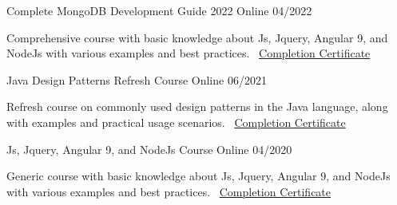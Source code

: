 \documentclass[]{awesome-cv}
\begin{document}
\begin{cventries}
	\cventry
	{}
	{Complete MongoDB Development Guide 2022 \vspace{-4mm}}
	{Online \vspace{-5mm}}
	{04/2022 \vspace{-5mm}}
	{\begin{cvsectionnormaltext} 
		\item{Comprehensive course with basic knowledge about Js, Jquery, Angular 9, and NodeJs with various examples and best practices.
		\newline \vspace{2mm} \faLink\ \href{https://www.udemy.com/certificate/UC-b990e98a-9b76-44b1-8e3e-43b68213725c/}{Completion Certificate}}
	\end{cvsectionnormaltext}}
    {}
    
	\cventry
	{}
	{Java Design Patterns Refresh Course \vspace{-4mm}}
	{Online \vspace{-5mm}}
	{06/2021 \vspace{-5mm}}
	{\begin{cvsectionnormaltext} 
		\item{Refresh course on commonly used design patterns in the Java language, along with examples and practical usage scenarios.
		\newline \vspace{2mm} \faLink\ \href{https://www.udemy.com/certificate/UC-982e3338-ea7d-4434-bf27-af8e38b77bd5/}{Completion Certificate}}
	\end{cvsectionnormaltext}}
    {}

    
	\cventry
	{}
	{Js, Jquery, Angular 9, and NodeJs Course \vspace{-4mm}}
	{Online \vspace{-5mm}}
	{04/2020 \vspace{-5mm}}
	{\begin{cvsectionnormaltext} 
		\item{Generic course with basic knowledge about Js, Jquery, Angular 9, and NodeJs with various examples and best practices.
		\newline \vspace{2mm} \faLink\ \href{https://www.udemy.com/certificate/UC-012febdf-7657-4e65-8708-ee4e18d5a8e1/}{Completion Certificate}}
	\end{cvsectionnormaltext}}
    {}
\end{cventries}
\end{document}
